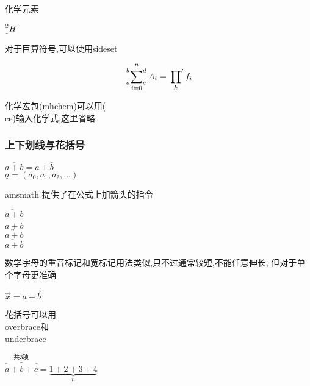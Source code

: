 \documentclass[UTF8]{ctexart}
\begin{document}
化学元素
\begin{codeshow}
  $\prescript{2}{1}{H}$
\end{codeshow}

对于巨算符号,可以使用sideset
\begin{codeshow}
  \[ \sideset{_a^b}{_c^d}
  \sum_{i=0}^n A_i
  = \sideset{}{'}
  \prod_k f_i \]
\end{codeshow}

化学宏包(mhchem)可以用(\\ce)输入化学式,这里省略

\subsubsection{上下划线与花括号}
\begin{codeshow}
  $\overline{a+b} =
  \overline a + \overline b$ \\
  $ \underline a = (a_0,a_1,a_2, \dots) $
\end{codeshow}

amsmath 提供了在公式上加箭头的指令
\begin{codeshow}
  $\overleftarrow{a+b}$\\
  $\overrightarrow{a+b}$\\
  $\overleftrightarrow{a+b}$\\
  $\underleftarrow{a+b}$\\
\end{codeshow}

数学字母的重音标记和宽标记用法类似,只不过通常较短,不能任意伸长,
但对于单个字母更准确
\begin{codeshow}
  $\vec x = \overrightarrow{a+b}$
\end{codeshow}

花括号可以用\\overbrace和\\underbrace
\begin{codeshow}
  $\overbrace{a+b+c}^{\text{共3项}} =
   \underbrace{1+2+3+4}_{n}$
\end{codeshow}
\end{document}

